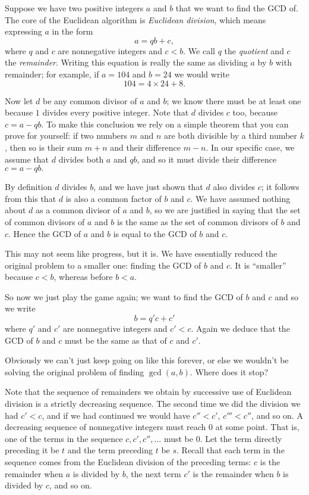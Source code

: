 Suppose we have two positive integers $a$ and $b$ that we want to find the GCD of.
The core of the Euclidean algorithm is {\it Euclidean division}, which means expressing $a$
in the form $$a=qb+c,$$ where $q$ and $c$ are nonnegative integers and $c<b$. We call $q$
the {\it quotient} and $c$ the {\it remainder}. Writing
this equation is really the same as dividing $a$ by $b$ with remainder; for example, if $a=104$ and $b=24$
we would write $$104=4\times24+8.$$

Now let $d$ be any common divisor of $a$ and $b$; we know there must be at least one
because $1$ divides every positive integer. Note that $d$ divides $c$ too, because $c=a-qb$.
To make this conclusion we rely on a simple theorem that you can prove for yourself:
if two numbers $m$ and $n$ are both divisible by a third number $k$, then so is their
sum $m+n$ and their difference $m-n$. In our specific case, we assume that $d$ divides both
$a$ and $qb$, and so it must divide their difference $c=a-qb.$

By definition $d$ divides $b$, and we have just shown that $d$ also divides $c$; it follows
from this that $d$ is also a common factor of $b$ and $c$. We have assumed nothing about $d$
as a common divisor of $a$ and $b$, so we are justified in saying that the set of common
divisors of $a$ and $b$ is the same as the set of common divisors of $b$ and $c$. Hence the
GCD of $a$ and $b$ is equal to the GCD of $b$ and $c$.

This may not seem like progress, but it is. We have essentially reduced the original
problem to a smaller one: finding the GCD of $b$ and $c$. It is ``smaller'' because $c<b$,
whereas before $b<a$.

So now we just play the game again; we want to find the GCD of $b$ and $c$ and so we write
$$b=q'c+c'$$
where $q'$ and $c'$ are nonnegative integers and $c'<c$. Again we deduce that the GCD of $b$
and $c$ must be the same as that of $c$ and $c'$.

Obviously  we can't just keep going on like this forever, or else we wouldn't be solving
the original problem of finding $\gcd(a,b)$. Where does it stop?

Note that the sequence of remainders we obtain by successive use of Euclidean division is a strictly decreasing sequence.
The second time we did the division we had $c'<c$, and if we had continued we would have $c''<c'$, $c'''<c''$, and so on.
A decreasing sequence of nonnegative integers must reach $0$ at some point. That is, one of the terms in the sequence
$c,c',c'',\ldots$ must be $0$. Let the term directly preceding it be $t$ and the term preceding $t$ be $s$. Recall
that each term in the sequence comes from the Euclidean division of the preceding terms: $c$ is the remainder
when $a$ is divided by $b$, the next term $c'$ is the remainder when $b$ is divided by $c$, and so on.

